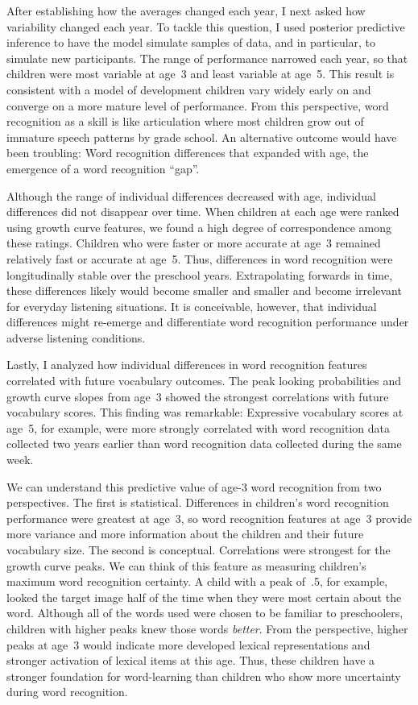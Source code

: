 \documentclass [11pt, proquest] {uwthesis}[2015/03/03]
\begin{document}
After establishing how the averages changed each year, I next asked how
variability changed each year. To tackle this question, I used posterior
predictive inference to have the model simulate samples of data, and in
particular, to simulate new participants. The range of performance
narrowed each year, so that children were most variable at age~3 and
least variable at age~5. This result is consistent with a model of
development children vary widely early on and converge on a more mature
level of performance. From this perspective, word recognition as a skill
is like articulation where most children grow out of immature speech
patterns by grade school. An alternative outcome would have been
troubling: Word recognition differences that expanded with age, the
emergence of a word recognition ``gap''.

Although the range of individual differences decreased with age,
individual differences did not disappear over time. When children at
each age were ranked using growth curve features, we found a high degree
of correspondence among these ratings. Children who were faster or more
accurate at age~3 remained relatively fast or accurate at age~5. Thus,
differences in word recognition were longitudinally stable over the
preschool years. Extrapolating forwards in time, these differences
likely would become smaller and smaller and become irrelevant for
everyday listening situations. It is conceivable, however, that
individual differences might re-emerge and differentiate word
recognition performance under adverse listening conditions.

Lastly, I analyzed how individual differences in word recognition
features correlated with future vocabulary outcomes. The peak looking
probabilities and growth curve slopes from age~3 showed the strongest
correlations with future vocabulary scores. This finding was remarkable:
Expressive vocabulary scores at age~5, for example, were more strongly
correlated with word recognition data collected two years earlier than
word recognition data collected during the same week.

We can understand this predictive value of age-3 word recognition from
two perspectives. The first is statistical. Differences in children's
word recognition performance were greatest at age~3, so word recognition
features at age~3 provide more variance and more information about the
children and their future vocabulary size. The second is conceptual.
Correlations were strongest for the growth curve peaks. We can think of
this feature as measuring children's maximum word recognition certainty.
A child with a peak of~.5, for example, looked the target image half of
the time when they were most certain about the word. Although all of the
words used were chosen to be familiar to preschoolers, children with
higher peaks knew those words \emph{better}. From the perspective,
higher peaks at age~3 would indicate more developed lexical
representations and stronger activation of lexical items at this age.
Thus, these children have a stronger foundation for word-learning than
children who show more uncertainty during word recognition.
\end{document}
